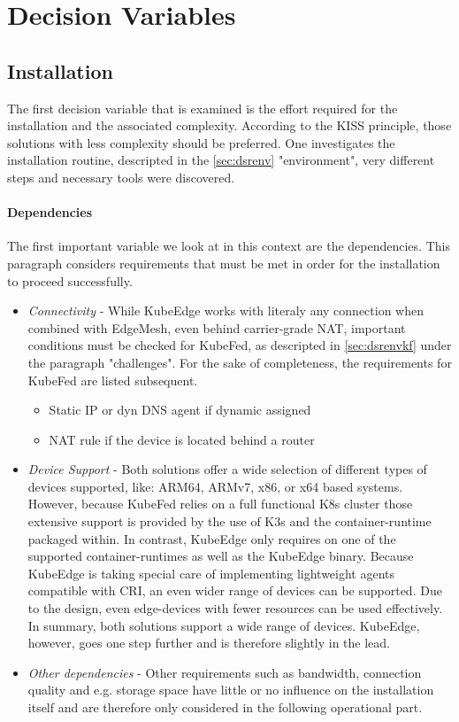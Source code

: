 \documentclass[MSC,Master,english]{twbook}%
\begin{document}
\section{Decision Variables}
\label{sec:variables}
\subsection{Installation}
The first decision variable that is examined is the effort required for the installation and the associated complexity. According to the KISS principle\cite{kiss}, those solutions with less complexity should be preferred. One investigates the installation routine, descripted in the  \autoref{sec:dsrenv} "environment", very different steps and necessary tools were discovered. 
\paragraph{Dependencies} The first important variable we look at in this context are the dependencies. This paragraph considers requirements that must be met in order for the installation to proceed successfully.

\begin{itemize}
    \item \textit{Connectivity} - While KubeEdge works with literaly any connection when combined with EdgeMesh, even behind carrier-grade \ac{NAT}\cite{cg-nat}, important conditions must be checked for KubeFed, as descripted in \autoref{sec:dsrenvkf} under the paragraph "challenges". For the sake of completeness, the requirements for KubeFed are listed subsequent.
    \begin{itemize}
        \item Static \ac{IP} or dyn \ac{DNS} agent if dynamic assigned
        \item \ac{NAT} rule if the device is located behind a router
    \end{itemize}
    \item \textit{Device Support} - Both solutions offer a wide selection of different types of devices supported, like: ARM64, ARMv7, x86, or x64 based systems. However, because \ac{KubeFed} relies on a full functional \ac{K8s} cluster those extensive support is provided by the use of K3s and the container-runtime packaged within. In contrast, KubeEdge only requires on one of the supported container-runtimes as well as the KubeEdge binary. Because KubeEdge is taking special care of implementing lightweight agents compatible with \ac{CRI}\cite{k8scri}\cite{ke-cri-gh}, an even wider range of devices can be supported. Due to the design, even edge-devices with fewer resources can be used effectively. In summary, both solutions support a wide range of devices. KubeEdge, however, goes one step further and is therefore slightly in the lead.
    \item \textit{Other dependencies} - Other requirements such as bandwidth, connection quality and e.g. storage space have little or no influence on the installation itself and are therefore only considered in the following operational part.
\end{itemize}
\end{document}
